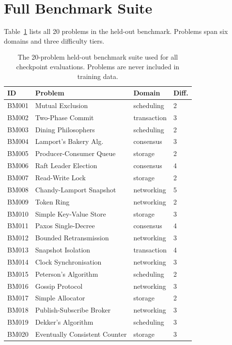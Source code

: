 \documentclass[11pt]{article}
\begin{document}
\section{Full Benchmark Suite}
\label{app:benchmark}

Table~\ref{tab:benchmark-suite} lists all 20 problems in the held-out
benchmark.  Problems span six domains and three difficulty tiers.

\begin{table}[h]
\centering
\small
\setlength{\tabcolsep}{4pt}
\begin{tabular}{@{}llll@{}}
\toprule
ID & Problem & Domain & Diff. \\
\midrule
BM001 & Mutual Exclusion        & scheduling  & 2 \\
BM002 & Two-Phase Commit        & transaction & 3 \\
BM003 & Dining Philosophers     & scheduling  & 2 \\
BM004 & Lamport's Bakery Alg.   & consensus   & 3 \\
BM005 & Producer-Consumer Queue & storage     & 2 \\
BM006 & Raft Leader Election    & consensus   & 4 \\
BM007 & Read-Write Lock         & storage     & 2 \\
BM008 & Chandy-Lamport Snapshot & networking  & 5 \\
BM009 & Token Ring              & networking  & 2 \\
BM010 & Simple Key-Value Store  & storage     & 3 \\
BM011 & Paxos Single-Decree     & consensus   & 4 \\
BM012 & Bounded Retransmission  & networking  & 3 \\
BM013 & Snapshot Isolation      & transaction & 4 \\
BM014 & Clock Synchronisation   & networking  & 3 \\
BM015 & Peterson's Algorithm    & scheduling  & 2 \\
BM016 & Gossip Protocol         & networking  & 3 \\
BM017 & Simple Allocator        & storage     & 2 \\
BM018 & Publish-Subscribe Broker& networking  & 3 \\
BM019 & Dekker's Algorithm      & scheduling  & 3 \\
BM020 & Eventually Consistent Counter & storage & 3 \\
\bottomrule
\end{tabular}
\caption{The 20-problem held-out benchmark suite used for all
checkpoint evaluations.  Problems are never included in training data.}
\label{tab:benchmark-suite}
\end{table}
\end{document}
